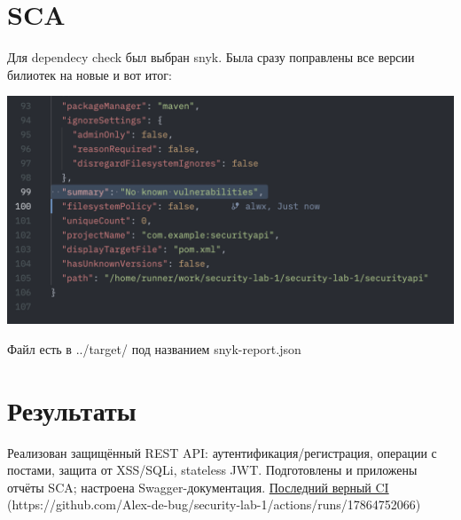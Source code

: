 \documentclass{article}
\begin{document}
\section*{SCA}
Для dependecy check был выбран snyk. Была сразу поправлены все версии билиотек на новые и вот итог:
\begin{center}
  \includegraphics[width=.9\textwidth]{snyk.png}
\end{center}

Файл есть в ../target/ под названием snyk-report.json


\section*{Результаты}
Реализован защищённый REST API: аутентификация/регистрация, операции с постами, защита от XSS/SQLi, stateless JWT. Подготовлены и приложены отчёты SCA; настроена Swagger-документация.
\href{https://github.com/Alex-de-bug/security-lab-1/actions/runs/17864752066}{Последний верный CI} (https://github.com/Alex-de-bug/security-lab-1/actions/runs/17864752066)
\end{document}
